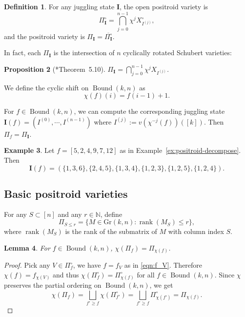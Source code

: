 \documentclass[12pt,reqno]{amsart}
\newtheorem{lemma}{Lemma}[section]
\newtheorem{prop}[lemma]{Proposition}
\theoremstyle{definition}
\newtheorem{definition}[lemma]{Definition}
\newtheorem{example}[lemma]{Example}
\newcommand{\rank}{\operatorname{rank}}
\newcommand{\gr}{\mathrm{Gr}}
\newcommand{\bound}{\operatorname{Bound}}
\begin{document}
{\begin{definition}\label{def:jugglingstate}
    For any juggling state $\mathbf{I}$, the open positroid variety is
    \[\Pi_{\mathbf{I}}^\circ = \bigcap_{j = 0}^{n-1} \chi^j X^\circ_{I^{(j)}},\]
and the positroid variety is $\Pi_{\mathbf{I}} = \overline{\Pi_{\mathbf{I}}^\circ}$. 
\end{definition}
In fact, each $\Pi_{\mathbf{I}}$ is the intersection of $n$ cyclically rotated Schubert varieties:
\begin{prop}[\cite{KLS13juggling}*{Theorem~5.10}]\label{prop:positroidcyclicschub}
    $\Pi_{\mathbf{I}} = \bigcap_{j = 0}^{n-1} \chi^j X_{I^{(j)}}$.
\end{prop}

We  define the  cyclic shift on $\bound(k,n)$ as
\[\chi(f)(i) = f(i-1)+1.\]

For $f\in\bound(k,n)$, we can compute the corresponding juggling state $\mathbf{I}(f)=(I^{(0)},\cdots,I^{(n-1)})$ where $I^{(j)}:=v(\chi^{-j}(f))([k])$. Then $\Pi_f=\Pi_\mathbf{I}$.

\begin{example}
    Let $f=[5,2,4,9,7,12]$ as in Example~\ref{ex:positroid-decompose}. Then 
    \[\mathbf{I}(f)=(\{1,3,6\},\{2,4,5\},\{1,3,4\},\{1,2,3\},\{1,2,5\},\{1,2,4\}).\]
\end{example}

\subsection{Basic positroid varieties}
\label{subsec:basic-positroid}


For any $S\subset [n]$ and any $r\in \mathbb{N}$, define
\[\Pi_{S\leq r} = \{M\in \gr(k,n): \rank(M_{S}) \leq r\},\]
where $\rank(M_S)$ is the rank of the submatrix of $M$ with column index $S$. 




    

\begin{lemma}\label{lemma:chi}
    For $f\in \bound(k,n)$, $\chi(\Pi_{f}) = \Pi_{\chi(f)}$.
\end{lemma}
\begin{proof}
    Pick any $V\in \Pi_f^{\circ}$, we have $f = f_V$ as in \eqref{eqn:f_V}. Therefore $\chi(f) = f_{\chi(V)}$ and thus $\chi(\Pi_{f}^\circ) = \Pi_{\chi(f)}^\circ$ for all $f\in \bound(k,n)$. Since $\chi$ preserves the partial ordering on $\bound(k,n)$, we get \[\chi(\Pi_{f}) = \bigsqcup_{f'\geq f} \chi(\Pi_{f'}^\circ) = \bigsqcup_{f'\geq f} \Pi_{\chi(f')}^\circ  = \Pi_{\chi(f)}.\]
\end{proof}
    
}
\end{document}

